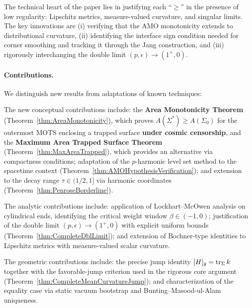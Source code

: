 The technical heart of the paper lies in justifying each ``$\ge$'' in the presence of low regularity: Lipschitz metrics, measure-valued curvature, and singular limits. The key innovations are (i) verifying that the AMO monotonicity extends to distributional curvature, (ii) identifying the interface sign condition needed for corner smoothing and tracking it through the Jang construction, and (iii) rigorously interchanging the double limit $(p, \epsilon) \to (1^+, 0)$.

\paragraph{Contributions.} We distinguish new results from adaptations of known techniques:

The new conceptual contributions include: the \textbf{Area Monotonicity Theorem} (Theorem~\ref{thm:AreaMonotonicity}), which proves $A(\Sigma^*) \ge A(\Sigma_0)$ for the outermost MOTS enclosing a trapped surface \textbf{under cosmic censorship}, and the \textbf{Maximum Area Trapped Surface Theorem} (Theorem~\ref{thm:MaxAreaTrapped}), which provides an alternative via compactness conditions; adaptation of the $p$-harmonic level set method to the spacetime context (Theorem~\ref{thm:AMOHypothesisVerification}); and extension to the decay range $\tau \in (1/2, 1]$ via harmonic coordinates (Theorem~\ref{thm:PenroseBorderline}).

The analytic contributions include: application of Lockhart--McOwen analysis on cylindrical ends, identifying the critical weight window $\beta \in (-1,0)$; justification of the double limit $(p, \epsilon) \to (1^+, 0)$ with explicit uniform bounds (Theorem~\ref{thm:CompleteDblLimit}); and extension of Bochner-type identities to Lipschitz metrics with measure-valued scalar curvature.

The geometric contributions include: the precise jump identity $[H]_{\bar{g}}=\operatorname{tr}_\Sigma k$ together with the favorable-jump criterion used in the rigorous core argument (Theorem~\ref{thm:CompleteMeanCurvatureJump}); and characterization of the equality case via static vacuum bootstrap and Bunting--Masood-ul-Alam uniqueness.

